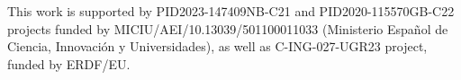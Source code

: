 \documentclass[dvipsnames,format=sigconf]{acmart}
\begin{document}
\begin{acks}
This work is supported by PID2023-147409NB-C21 and PID2020-115570GB-C22 projects funded by MICIU/AEI/10.13039/501100011033 (Ministerio Español de Ciencia, Innovación y Universidades), as well as C-ING-027-UGR23 project, funded by ERDF/EU.
\end{acks}



\end{document}
